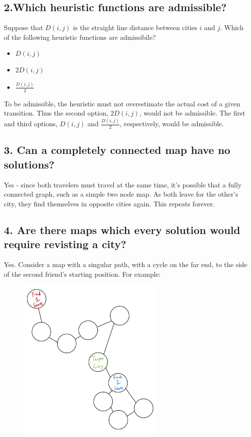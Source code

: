 \documentclass{article}
\begin{document}
\subsection*{2.Which heuristic functions are admissible?}
Suppose that $D(i, j)$ is the straight line distance between cities $i$ and $j$. Which of the following heuristic functions are admissibile?

\begin{itemize}
    \item $D(i,j)$
    \item $2D(i,j)$
    \item $\frac{D(i,j)}{2}$
\end{itemize}

\noindent To be admissible, the heuristic must not overestimate the actual cost of a given transition. Thus the second option, $2D(i,j)$, would not be admissible. The first and third options, $D(i,j)$ and $\frac{D(i,j)}{2}$, respectively, would be admissible.

\subsection*{3. Can a completely connected map have no solutions?}
Yes - since both travelers must travel at the same time, it's possible that a fully connected graph, such as a simple two node map. As both leave for the other's city, they find themselves in opposite cities again. This repeats forever.

\subsection*{4. Are there maps which every solution would require revisting a city?}
Yes. Consider a map with a singular path, with a cycle on the far end, to the side of the second friend's starting position. For example:

\begin{figure}[H]
    \centering
    \includegraphics[width = 0.65\textwidth]{imgs/grid_example.jpg}
\end{figure}
\end{document}
